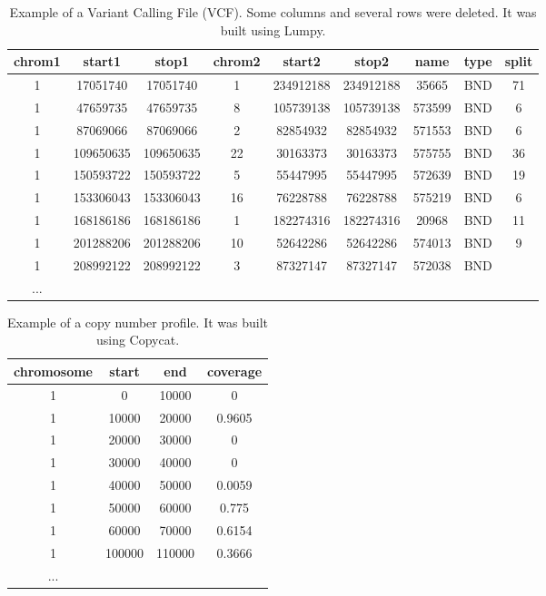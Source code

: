 \documentclass{svproc}
\begin{document}
\begin{table}[H]
	\centering
	\caption{Example of a Variant Calling File (VCF). Some columns and several rows were deleted. It was built using Lumpy.}
	\label{tab:vcf}
	\begin{tabular}{ccccccccc}
		\hline
		\textbf{chrom1} & \textbf{start1}    & \textbf{stop1}     & \textbf{chrom2} & \textbf{start2}    & \textbf{stop2}     & \textbf{name} & \textbf{type} & \textbf{split} \\ \hline
		1      & 17051740  & 17051740  & 1      & 234912188 & 234912188 & 35665         & BND           & 71    \\
		1      & 47659735  & 47659735  & 8      & 105739138 & 105739138 & 573599        & BND           & 6     \\
		1      & 87069066  & 87069066  & 2      & 82854932  & 82854932  & 571553        & BND           & 6     \\
		1      & 109650635 & 109650635 & 22     & 30163373  & 30163373  & 575755        & BND           & 36    \\
		1      & 150593722 & 150593722 & 5      & 55447995  & 55447995  & 572639        & BND           & 19    \\
		1      & 153306043 & 153306043 & 16     & 76228788  & 76228788  & 575219        & BND           & 6     \\
		1      & 168186186 & 168186186 & 1      & 182274316 & 182274316 & 20968         & BND           & 11    \\
		1      & 201288206 & 201288206 & 10     & 52642286  & 52642286  & 574013        & BND           & 9     \\
		1      & 208992122 & 208992122 & 3      & 87327147  & 87327147  & 572038        & BND           & \\ 
		... \\ \hline
	\end{tabular}
\end{table}

\begin{table}[H]
	\centering
	\caption{Example of a copy number profile. It was built using Copycat.}
	\label{tab:cn}
	\begin{tabular}{cccc} 
		\hline
		\textbf{chromosome} & \textbf{start}  & \textbf{end}    & \textbf{coverage} \\ \hline
		1          & 0      & 10000  & 0        \\
		1          & 10000  & 20000  & 0.9605   \\
		1          & 20000  & 30000  & 0        \\
		1          & 30000  & 40000  & 0        \\
		1          & 40000  & 50000  & 0.0059   \\
		1          & 50000  & 60000  & 0.775    \\
		1          & 60000  & 70000  & 0.6154   \\
		1          & 100000 & 110000 & 0.3666  \\
		... \\ \hline
	\end{tabular}
\end{table}
\end{document}

